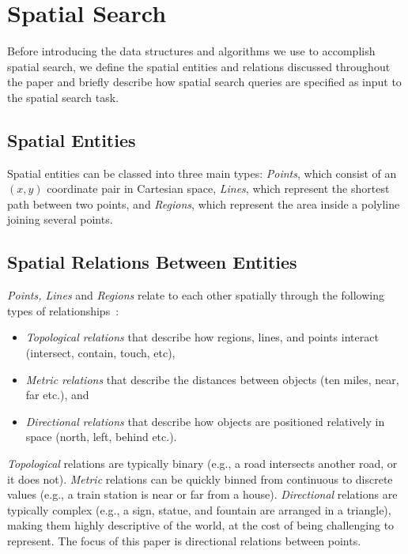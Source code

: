\section{Spatial Search}
\label{section:background}
Before introducing the data structures and algorithms we use to accomplish spatial search, we define the spatial entities and relations discussed throughout the paper and briefly describe how spatial search queries are specified as input to the spatial search task.
\subsection{Spatial Entities}
\par{
    Spatial entities can be classed into three main types: \textit{Points}, which consist of an $(x,y)$ coordinate pair in Cartesian space, \textit{Lines}, which represent the shortest path between two points, and \textit{Regions}, which represent the area inside a polyline joining several points.                         
        
}


\subsection{Spatial Relations Between Entities}
\par{
     \textit{Points, Lines} and \textit{Regions} relate to each other spatially through the following types of relationships~\cite{Carniel2020,Bertella2022,Carniel2023}:
    \begin{itemize}
        \item \textit{Topological relations} that describe how regions, lines, and points interact (intersect, contain, touch, etc),
        \item \textit{Metric relations} that describe the distances between objects (ten miles, near, far etc.), and
        \item \textit{Directional relations} that describe how objects are positioned relatively in space (north, left, behind etc.).     \end{itemize}

    \textit{Topological} relations are typically binary (e.g., a road intersects another road, or it does not). 
    \textit{Metric} relations can be quickly binned from continuous to discrete values (e.g., a train station is near or far from a house).
    \textit{Directional} relations are typically complex (e.g., a sign, statue, and fountain are arranged in a triangle), making them highly descriptive of the world, at the cost of being challenging to represent.
        The focus of this paper is directional relations between points. 

}

